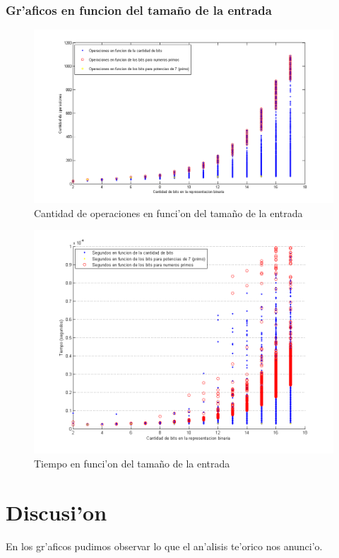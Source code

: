 \subsubsection{Gr'aficos en funcion del tama\~{n}o de la entrada}
\begin{figure}[H]
\centering
\includegraphics[scale=0.7]{../../codigo/ejercicio1/benchmark/graficos/tamanio_Entrada_T/operacionesEntrada.png}
\caption{Cantidad de operaciones en funci'on del tama\~{n}o de la entrada}
\end{figure}

\begin{figure}[H]
\centering
\includegraphics[scale=0.7]{../../codigo/ejercicio1/benchmark_de_tiempo/graficos/tamanio_Entrada_T/Tiempo_en_funcion_bits.png}
\caption{Tiempo en funci'on del tama\~{n}o de la entrada}
\end{figure}

\section{Discusi'on}
En los gr'aficos pudimos observar lo que el an'alisis te'orico nos anunci'o.

